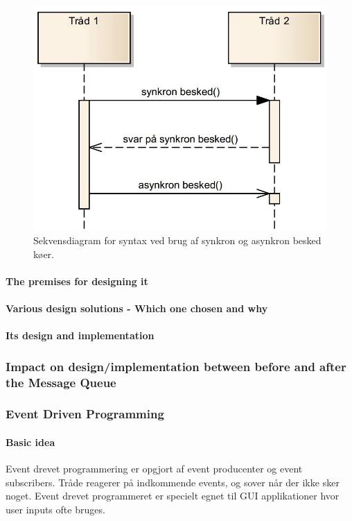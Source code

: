\begin{figure}[h]
	\centering
	\includegraphics[width=0.6\linewidth]{figs/spm3/msq_seqdia}
	\caption[Syntax for sekvensdiagram med syn -og asynkron msq.]{Sekvensdiagram for syntax ved brug af synkron og asynkron besked køer.}
	\label{fig:msq_seqdia}
\end{figure}

\paragraph{The premises for designing it}

\paragraph{Various design solutions - Which one chosen and why}

\paragraph{Its design and implementation}

\subsubsection{Impact on design/implementation between before and after the Message Queue}

\subsubsection{Event Driven Programming}

\paragraph{Basic idea}
Event drevet programmering er opgjort af event producenter og event subscribers.
Tråde reagerer på indkommende events, og sover når der ikke sker noget.
Event drevet programmeret er specielt egnet til GUI applikationer hvor user inputs ofte bruges. \\


